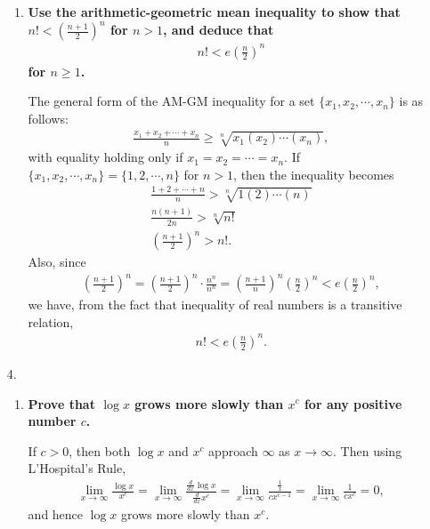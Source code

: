 \documentclass[a4paper,12pt]{article}
\begin{document}
\begin{enumerate}
\begin{enumerate}
            \item
                \boldmath
                \textbf{Use the arithmetic-geometric mean inequality to show that $n! < (\frac{n + 1}{2})^n$ for $n > 1$, and deduce that
                \begin{align*}
                    n! < e \left( \frac{n}{2} \right)^n
                \end{align*}
                for $n \geq 1$.} \par
                \unboldmath
                The general form of the AM-GM inequality for a set $\{ x_1, x_2, \cdots, x_n \}$ is as follows:
                \begin{align*}
                    \frac{x_1 + x_2 + \cdots + x_n}{n} \geq \sqrt[n]{x_1(x_2)\cdots(x_n)},
                \end{align*}
                with equality holding only if $x_1 = x_2 = \cdots = x_n$. If $\{ x_1, x_2, \cdots, x_n \} = \{ 1, 2, \cdots, n \}$ for $n > 1$, then the inequality becomes
                \begin{gather*}
                    \frac{1 + 2 + \cdots + n}{n} > \sqrt[n]{1(2)\cdots(n)} \\
                    \frac{n(n + 1)}{2n} > \sqrt[n]{n!} \\
                    \left( \frac{n + 1}{2} \right)^n > n!.
                \end{gather*}
                Also, since
                \begin{gather*}
                    \left( \frac{n + 1}{2} \right)^n = \left( \frac{n + 1}{2} \right)^n \cdot \frac{n^n}{n^n} = \left( \frac{n + 1}{n} \right)^n \left( \frac{n}{2} \right)^n < e \left( \frac{n}{2} \right)^n,
                \end{gather*}
                we have, from the fact that inequality of real numbers is a transitive relation,
                \begin{align*}
                    n! < e \left( \frac{n}{2} \right)^n.
                \end{align*}
        \end{enumerate}

    \item[4.]
        \begin{enumerate}
            \item
                \boldmath
                \textbf{Prove that $\log x$ grows more slowly than $x^c$ for any positive number $c$.} \par
                \unboldmath
                If $c > 0$, then both $\log x$ and $x^c$ approach $\infty$ as $x \to \infty$. Then using L'Hospital's Rule,
                \begin{align*}
                    \lim_{x \to \infty} \frac{\log x}{x^c} = \lim_{x \to \infty} \frac{\frac{d}{dx} \log x}{\frac{d}{dx} x^c} = \lim_{x \to \infty} \frac{\frac{1}{x}}{cx^{c - 1}} = \lim_{x \to \infty} \frac{1}{cx^c} = 0,
                \end{align*}
                and hence $\log x$ grows more slowly than $x^c$.


\end{enumerate}
\end{enumerate}
\end{document}
